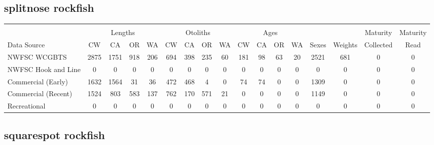 \documentclass[12pt,]{article}
\begin{document}
\FloatBarrier  

\subsection{splitnose rockfish}\label{splitnose-rockfish}

\begin{table}[ht]
\centering
\begingroup\fontsize{10pt}{10pt}\selectfont
\begin{tabular}{|l|cccc|cccc|cccc|c|c|c|c|}
  \hline
 &  &  &  &  &  &  &  &  &  &  &  &  &  &  &  &  \\ 
   & \multicolumn{4}{c}{Lengths} &  \multicolumn{4}{c}{Otoliths} & \multicolumn{4}{c}{Ages} &  & & Maturity & Maturity\\
 Data Source & CW & CA & OR & WA & CW & CA & OR & WA & CW & CA & OR & WA & Sexes & Weights & Collected & Read\\
 \hline
NWFSC WCGBTS & 2875 & 1751 & 918 & 206 & 694 & 398 & 235 & 60 & 181 & 98 & 63 & 20 & 2521 & 681 & 0 & 0 \\ 
  NWFSC Hook and Line & 0 & 0 & 0 & 0 & 0 & 0 & 0 & 0 & 0 & 0 & 0 & 0 & 0 & 0 & 0 & 0 \\ 
  Commercial (Early) & 1632 & 1564 & 31 & 36 & 472 & 468 & 4 & 0 & 74 & 74 & 0 & 0 & 1309 & 0 & 0 & 0 \\ 
  Commercial (Recent) & 1524 & 803 & 583 & 137 & 762 & 170 & 571 & 21 & 0 & 0 & 0 & 0 & 1149 & 0 & 0 & 0 \\ 
  Recreational & 0 & 0 & 0 & 0 & 0 & 0 & 0 & 0 & 0 & 0 & 0 & 0 & 0 & 0 & 0 & 0 \\ 
   \hline
\end{tabular}
\endgroup
\end{table}

\FloatBarrier  

\subsection{squarespot rockfish}\label{squarespot-rockfish}
\end{document}
